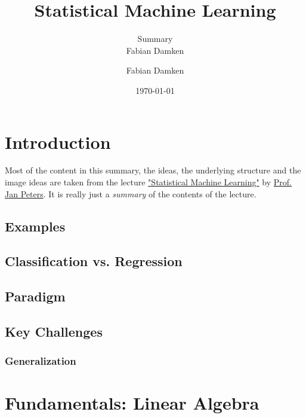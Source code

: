 \documentclass[a4paper, 11pt, accentcolor = tud3b]{tudreport}
\title{Statistical Machine Learning}
\subtitle{Summary \\ Fabian Damken}
\author{Fabian Damken}
\date{\today}
\begin{document}
	\maketitle
	\listoftodos
	\tableofcontents
	\listoffigures
	\listoftables
	\listofalgorithms

	\chapter{Introduction} %
		Most of the content in this summary, the ideas, the underlying structure and the image ideas are taken from the lecture \href{https://www.ias.informatik.tu-darmstadt.de/Teaching/MachineLearning1Lecture}{"Statistical Machine Learning"} by \href{https://www.ias.informatik.tu-darmstadt.de/Team/JanPeters}{Prof. Jan Peters}. It is really just a \emph{summary} of the contents of the lecture.


		\section{Examples} %

		\section{Classification vs. Regression} %

		\section{Paradigm} %

		\section{Key Challenges} %

			\subsection{Generalization} %

	\chapter{Fundamentals: Linear Algebra}
\end{document}
